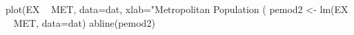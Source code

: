 \begin{Schunk}
\begin{Sinput}
 plot(EX  ~  MET, data=dat, xlab="Metropolitan Population (%)",ylab="Public Expenditures (Per Capita, 1960)")
 pemod2 <- lm(EX ~ MET, data=dat)
 abline(pemod2)
\end{Sinput}
\end{Schunk}
